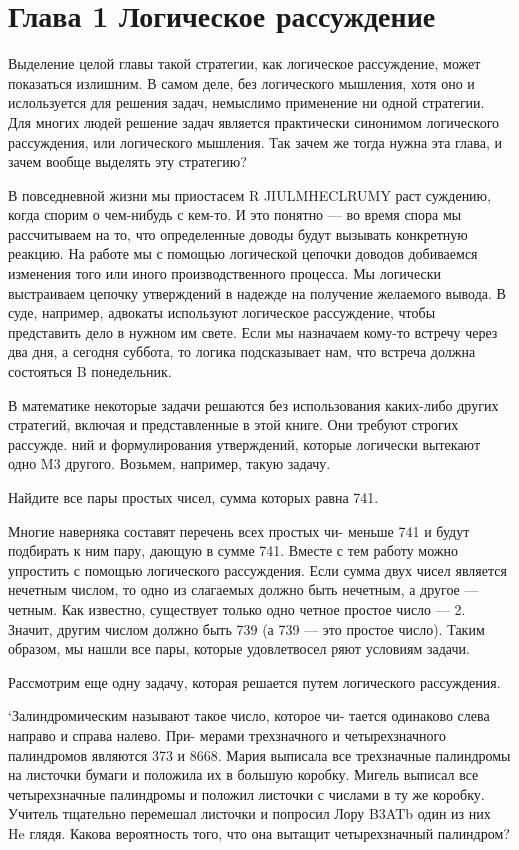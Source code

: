 \chapter{Глава 1 Логическое рассуждение}

Выделение целой главы такой стратегии, как логическое рассуждение, может показаться излишним. В самом деле, без логического мышления, хотя оно и ислользуется для решения задач, немыслимо применение ни одной стратегии. Для многих людей решение задач является практически синонимом логического рассуждения, или логического мышления. Так зачем же тогда нужна эта глава, и зачем вообще выделять эту стратегию?

В повседневной жизни мы приостасем R JIULMHECLRUMY раст суждению, когда спорим о чем-нибудь с кем-то. И это понятно — во время спора мы рассчитываем на то, что определенные доводы будут вызывать конкретную реакцию. На работе мы с помощью логической цепочки доводов добиваемся изменения того или иного производственного процесса. Мы логически выстраиваем цепочку утверждений в надежде на получение желаемого вывода. В суде, например, адвокаты используют логическое рассуждение, чтобы представить дело в нужном им свете. Если мы назначаем кому-то встречу через два дня, а сегодня суббота, то логика подсказывает нам, что встреча должна состояться B понедельник.

В математике некоторые задачи решаются без использования каких-либо других стратегий, включая и представленные в этой книге. Они требуют строгих рассужде. ний и формулирования утверждений, которые логически вытекают одно M3 другого. Возьмем, например, такую задачу.

Найдите все пары простых чисел, сумма которых равна 741.

Многие наверняка составят перечень всех простых чи- меньше 741 и будут подбирать к ним пару, дающую в сумме 741. Вместе с тем работу можно упростить с помощью логического рассуждения. Если сумма двух чисел является нечетным числом, то одно из слагаемых должно быть нечетным, а другое — четным. Как известно, существует только одно четное простое число — 2. Значит, другим числом должно быть 739 (а 739 — это простое число). Таким образом, мы нашли все пары, которые удовлетвосел ряют условиям задачи.

Рассмотрим еще одну задачу, которая решается путем логического рассуждения.

‘Залиндромическим называют такое число, которое чи- тается одинаково слева направо и справа налево. При- мерами трехзначного и четырехзначного палиндромов являются 373 и 8668. Мария выписала все трехзначные палиндромы на листочки бумаги и положила их в большую коробку. Мигель выписал все четырехзначные палиндромы и положил листочки с числами в ту же коробку. Учитель тщательно перемешал листочки и попросил Лору B3ATb один из них He глядя. Какова вероятность того, что она вытащит четырехзначный палиндром?

